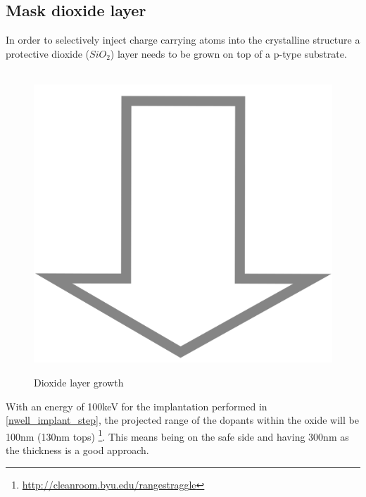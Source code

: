 \subsection{Mask dioxide layer}
In order to selectively inject charge carrying atoms into the crystalline structure a protective dioxide ($SiO_2$) layer needs to be grown on top of a p-type substrate.
\begin{figure}[H]
	\centering
	\begin{tikzpicture}[node distance = 3cm, auto, thick,scale=\CrossSectionOnly, every node/.style={transform shape}]
		
	\end{tikzpicture} \\
	\includegraphics[scale=0.01]{down_arrow.png} \\
	\begin{tikzpicture}[node distance = 3cm, auto, thick,scale=\CrossSectionOnly, every node/.style={transform shape}]
		
	\end{tikzpicture}
	\caption{Dioxide layer growth}
\end{figure}

With an energy of 100keV for the implantation performed in \autoref{nwell_implant_step}, the projected range of the dopants within the oxide will be 100nm (130nm tops) \footnote{\url{http://cleanroom.byu.edu/rangestraggle}}.
This means being on the safe side and having 300nm as the thickness is a good approach.

